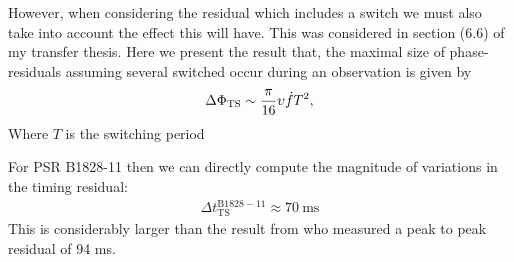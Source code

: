 \documentclass[../full_thesis/full_thesis.tex]{subfiles}
\begin{document}
However, when considering the residual which includes a switch we must also
take into account the effect this will have. This was considered in section (6.6)
of my transfer thesis. Here we present the result that, the maximal size of phase-residuals
assuming several switched occur during an observation is given by 
\begin{equation}
    \Delta\Phi_{\mathrm{TS}} \sim \frac{\pi}{16} \upsilon \dot{f}  T^{2},
\end{equation}
Where $T$ is the switching period

For PSR B1828-11 then we can directly compute the magnitude of variations in
the timing residual:
\begin{align}
    \Delta t_{\mathrm{TS}}^{\mathrm{B1828-11}} \approx 70\mathrm{~ms}
\end{align}
This is considerably larger than the result from \citet{Lyne2010} who measured a 
peak to peak residual of 94 ms.


\biblio
\end{document}
